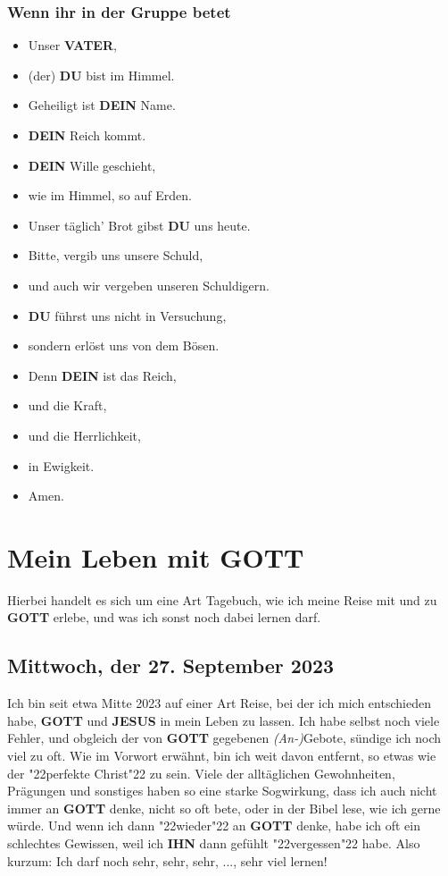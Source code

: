 \documentclass[12pt,a4paper]{article}
\newcommand{\Dein}[0]{\textbf{DEIN}}
\newcommand{\Du}[0]{\textbf{DU}}
\newcommand{\Gott}[0]{\textbf{GOTT}}
\newcommand{\Ihn}[0]{\textbf{IHN}}
\newcommand{\Jesus}[0]{\textbf{JESUS}}
\newcommand{\Vater}[0]{\textbf{VATER}}
\newcommand{\q}[1]{\char"22{#1}\char"22 }
\begin{document}
	\subsubsection{Wenn ihr in der Gruppe betet}
		\begin{itemize}[nosep]
			\item[]	Unser {\Vater},
			\item[]	(der) {\Du} bist im Himmel.
			\item[]	Geheiligt ist {\Dein} Name.
			\item[]	{\Dein} Reich kommt.
			\item[]	{\Dein} Wille geschieht,
			\item[]	wie im Himmel,
					so auf Erden.
			\item[]	Unser t\"aglich' Brot gibst {\Du} uns heute.
			\item[]	Bitte,
					vergib uns unsere Schuld,
			\item[]	und auch wir vergeben unseren Schuldigern.
			\item[]	{\Du} f\"uhrst uns nicht in Versuchung,
			\item[]	sondern erl\"ost uns von dem B\"osen.
			\item[]	Denn {\Dein} ist das Reich,
			\item[]	und die Kraft,
			\item[]	und die Herrlichkeit,
			\item[]	in Ewigkeit.
			\item[]	Amen.
		\end{itemize}

	\newpage
	\section{Mein Leben mit {\Gott}} \label{MeinLebenMitGott}
		Hierbei handelt es sich um eine Art Tagebuch,
		wie ich meine Reise mit und zu {\Gott} erlebe,
		und was ich sonst noch dabei lernen darf.
	
	\subsection{Mittwoch, der 27. September 2023}
		Ich bin seit etwa Mitte 2023 auf einer Art Reise,
		bei der ich mich entschieden habe,
		{\Gott} und {\Jesus} in mein Leben zu lassen.
		Ich habe selbst noch viele Fehler,
		und obgleich der von {\Gott} gegebenen \textit{(An-)}Gebote,
		s\"undige ich noch viel zu oft.
		Wie im Vorwort erw\"ahnt,
		bin ich weit davon entfernt,
		so etwas wie der \q{perfekte Christ} zu sein.
		Viele der allt\"aglichen Gewohnheiten,
		Pr\"agungen und sonstiges haben so eine starke Sogwirkung,
		dass ich auch nicht immer an {\Gott} denke,
		nicht so oft bete,
		oder in der Bibel lese,
		wie ich gerne w\"urde.
		Und wenn ich dann \q{wieder} an {\Gott} denke,
		habe ich oft ein schlechtes Gewissen,
		weil ich {\Ihn} dann gef\"uhlt \q{vergessen} habe.
		Also kurzum:
		Ich darf noch sehr, sehr, sehr, ..., sehr viel lernen!
		
\end{document}
